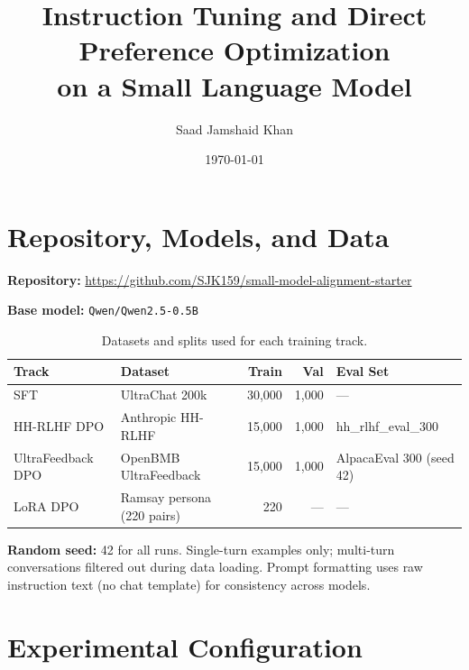 \documentclass[11pt,a4paper]{article}
\title{Instruction Tuning and Direct Preference Optimization\\on a Small Language Model}
\author{Saad Jamshaid Khan}
\date{\today}
\begin{document}
\maketitle

\section{Repository, Models, and Data}
\label{sec:repo}

\textbf{Repository:} \url{https://github.com/SJK159/small-model-alignment-starter}

\textbf{Base model:} \texttt{Qwen/Qwen2.5-0.5B}

\begin{table}[H]
\centering
\caption{Datasets and splits used for each training track.}
\begin{tabular}{llrrl}
\toprule
\textbf{Track} & \textbf{Dataset} & \textbf{Train} & \textbf{Val} & \textbf{Eval Set} \\
\midrule
SFT & UltraChat 200k & 30{,}000 & 1{,}000 & --- \\
HH-RLHF DPO & Anthropic HH-RLHF & 15{,}000 & 1{,}000 & hh\_rlhf\_eval\_300 \\
UltraFeedback DPO & OpenBMB UltraFeedback & 15{,}000 & 1{,}000 & AlpacaEval 300 (seed 42) \\
LoRA DPO & Ramsay persona (220 pairs) & 220 & --- & --- \\
\bottomrule
\end{tabular}
\end{table}

\textbf{Random seed:} 42 for all runs. Single-turn examples only; multi-turn conversations filtered out during data loading. Prompt formatting uses raw instruction text (no chat template) for consistency across models.

\section{Experimental Configuration}
\label{sec:config}
\end{document}
